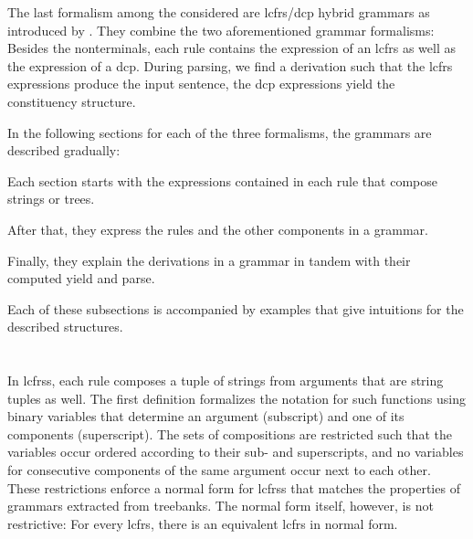 \documentclass[../document.tex]{subfiles}
\begin{document}
    The last formalism among the considered are \gls{lcfrs}/\gls{dcp} hybrid grammars as introduced by \citet{Geb}.
    They combine the two aforementioned grammar formalisms:
        Besides the nonterminals, each rule contains the expression of an \gls{lcfrs} as well as the expression of a \gls{dcp}.
    During parsing, we find a derivation such that the \gls{lcfrs} expressions produce the input sentence, the \gls{dcp} expressions yield the constituency structure.

    In the following sections for each of the three formalisms, the grammars are described gradually:
    \begin{inparaenum}[(i)]
        \item Each section starts with the expressions contained in each rule that compose strings or trees.
        \item After that, they express the rules and the other components in a grammar.
        \item Finally, they explain the derivations in a grammar in tandem with their computed yield and parse.
    \end{inparaenum}
    Each of these subsections is accompanied by examples that give intuitions for the described structures.

    \section{}

    In \glspl*{lcfrs}, each rule composes a tuple of strings from arguments that are string tuples as well.
    The first definition formalizes the notation for such functions using binary variables that determine an argument (subscript) and one of its components (superscript).
    The sets of compositions are restricted such that the variables occur ordered according to their sub- and superscripts, and no variables for consecutive components of the same argument occur next to each other.
    These restrictions enforce a normal form for \glspl{lcfrs} that matches the properties of grammars extracted from treebanks.
    The normal form itself, however, is not restrictive: For every \gls{lcfrs}, there is an equivalent \gls{lcfrs} in normal form. \cite{???}
\end{document}
